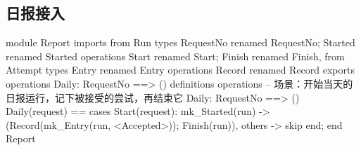 \subsection{日报接入}

\begin{vdm_al}
module Report
imports
  from Run
    types RequestNo renamed RequestNo; Started renamed Started
    operations Start renamed Start; Finish renamed Finish,
  from Attempt
    types Entry renamed Entry
    operations Record renamed Record
exports
  operations Daily: RequestNo ==> ()
definitions
operations
  -- 场景：开始当天的日报运行，记下被接受的尝试，再结束它
  Daily: RequestNo ==> ()
  Daily(request) ==
    cases Start(request):
      mk_Started(run) -> (Record(mk_Entry(run, <Accepted>)); Finish(run)),
      others -> skip
    end;
end Report
\end{vdm_al}
